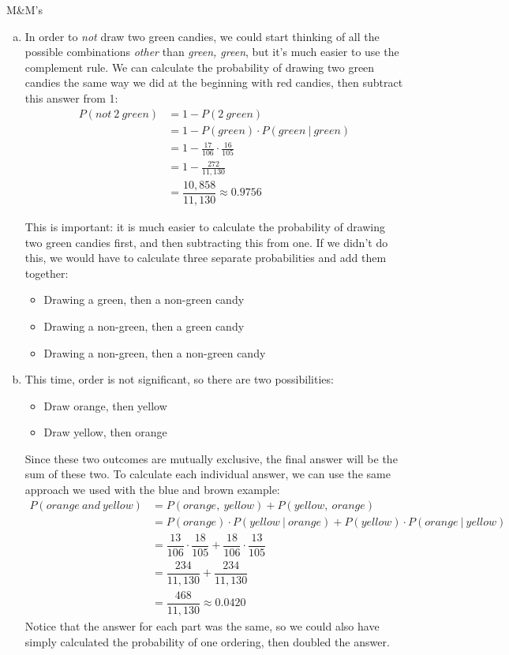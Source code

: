 \begin{example}[https://www.youtube.com/watch?v=7Xe9xjXlC3A]{M\&M's}
\begin{enumerate}[(a)]
\item In order to \emph{not} draw two green candies, we could start thinking of all the possible combinations \emph{other} than \emph{green, green}, but it's much easier to use the complement rule.  We can calculate the probability of drawing two green candies the same way we did at the beginning with red candies, then subtract this answer from 1:
\begin{align*}
P(not\ 2\ green) &= 1-P(2 \ green)\\
&= 1 - P(green) \cdot P(green \ | \ green)\\
&= 1-\frac{17}{106} \cdot \frac{16}{105}\\
&= 1 - \frac{272}{11,130}\\
&= \boxed{\dfrac{10,858}{11,130} \approx 0.9756}
\end{align*}

This is important: it is much easier to calculate the probability of drawing two green candies first, and then subtracting this from one.  If we didn't do this, we would have to calculate three separate probabilities and add them together:
\begin{itemize}
\item Drawing a green, then a non-green candy
\item Drawing a non-green, then a green candy
\item Drawing a non-green, then a non-green candy
\end{itemize}

\item This time, order is not significant, so there are two possibilities:
\begin{itemize}
\item Draw orange, then yellow
\item Draw yellow, then orange
\end{itemize}
Since these two outcomes are mutually exclusive, the final answer will be the sum of these two.  To calculate each individual answer, we can use the same approach we used with the blue and brown example:
\begin{align*}
P(orange\ and\ yellow) &= P(orange,\ yellow) + P(yellow,\ orange)\\
&= P(orange) \cdot P(yellow\ |\ orange) + P(yellow) \cdot P(orange\ |\ yellow)\\
&= \dfrac{13}{106} \cdot \dfrac{18}{105} + \dfrac{18}{106} \cdot \dfrac{13}{105}\\
&= \dfrac{234}{11,130} + \dfrac{234}{11,130}\\
&= \boxed{\dfrac{468}{11,130} \approx 0.0420}
\end{align*}
Notice that the answer for each part was the same, so we could also have simply calculated the probability of one ordering, then doubled the answer.
\end{enumerate}
\end{example}
\vfill
\pagebreak

